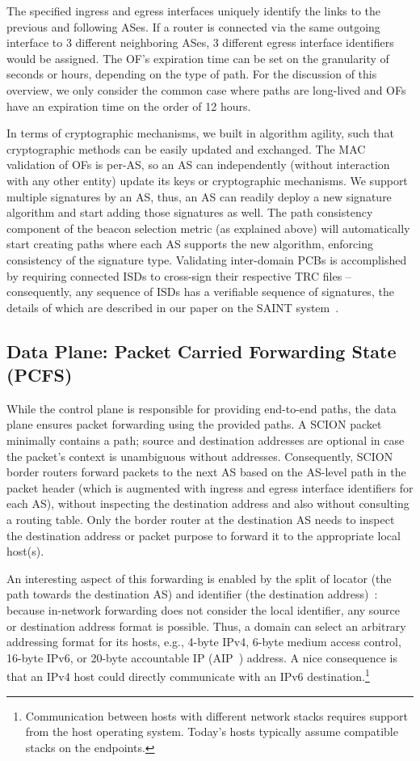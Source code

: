 \documentclass[a4paper]{llncs}
\newcommand\SCION{{\small\textsf{SCION}}\xspace}
\begin{document}
The specified ingress and egress interfaces uniquely identify the links to the
previous and following ASes. If a router is connected via the same outgoing
interface to 3 different neighboring ASes, 3 different egress interface
identifiers would be assigned. The OF's expiration time can be set on the
granularity of seconds or hours, depending on the type of path. For the
discussion of this overview, we only consider the common case where paths are
long-lived and OFs have an expiration time on the order of 12 hours.


In terms of cryptographic mechanisms, we built in algorithm agility,
such that cryptographic methods can be easily updated and exchanged.
The MAC validation of OFs is per-AS, so an AS can independently
(without interaction with any other entity) update its keys or
cryptographic mechanisms. We support multiple signatures by an AS,
thus, an AS can readily deploy a new signature algorithm and start
adding those signatures as well. The path consistency component of
the beacon selection metric (as explained above) will automatically
start creating paths where each AS supports the new algorithm,
enforcing consistency of the signature type. Validating inter-domain
PCBs is accomplished by requiring connected ISDs to cross-sign their
respective TRC files -- consequently, any sequence of ISDs has a
verifiable sequence of signatures, the details of which are described
in our paper on the SAINT system~\cite{MRSKP2015}.




\subsection{Data Plane: Packet Carried Forwarding State (PCFS)}

While the control plane is responsible for providing end-to-end paths, the data
plane ensures packet forwarding using the provided paths. A \SCION packet
minimally contains a path; source and destination addresses are optional in
case the packet's context is unambiguous without addresses. Consequently,
\SCION border routers forward packets to the next AS based on the AS-level path
in the packet header (which is augmented with ingress and egress interface
identifiers for each AS), without inspecting the destination address and
also without consulting a routing table. Only the border router at the
destination AS needs to inspect the destination address or packet purpose to
forward it to the appropriate local host(s).

An interesting aspect of this forwarding is enabled by the split of locator
(the path towards the destination AS) and identifier (the destination
address)~\cite{rfc6830}: because in-network forwarding does not consider the
local identifier, any source or destination address format is possible. Thus, a
domain can select an arbitrary addressing format for its hosts, e.g., 4-byte
IPv4, 6-byte medium access control, 16-byte IPv6, or 20-byte accountable IP
(AIP~\cite{AIP}) address. A nice consequence is that an IPv4 host could directly communicate with an IPv6 destination.\footnote{Communication between hosts with different network stacks requires support from the host operating system. Today's hosts typically assume compatible stacks on the endpoints.}
\end{document}
